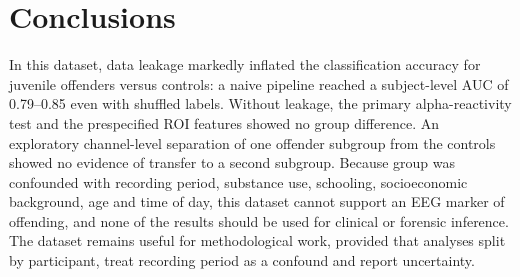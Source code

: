 \section{Conclusions}
\label{sec:conclusions}

In this dataset, data leakage markedly inflated the classification accuracy for juvenile offenders versus controls: a naive pipeline reached a subject-level AUC of 0.79--0.85 even with shuffled labels. Without leakage, the primary alpha-reactivity test and the prespecified ROI features showed no group difference. An exploratory channel-level separation of one offender subgroup from the controls showed no evidence of transfer to a second subgroup. Because group was confounded with recording period, substance use, schooling, socioeconomic background, age and time of day, this dataset cannot support an EEG marker of offending, and none of the results should be used for clinical or forensic inference. The dataset remains useful for methodological work, provided that analyses split by participant, treat recording period as a confound and report uncertainty.
